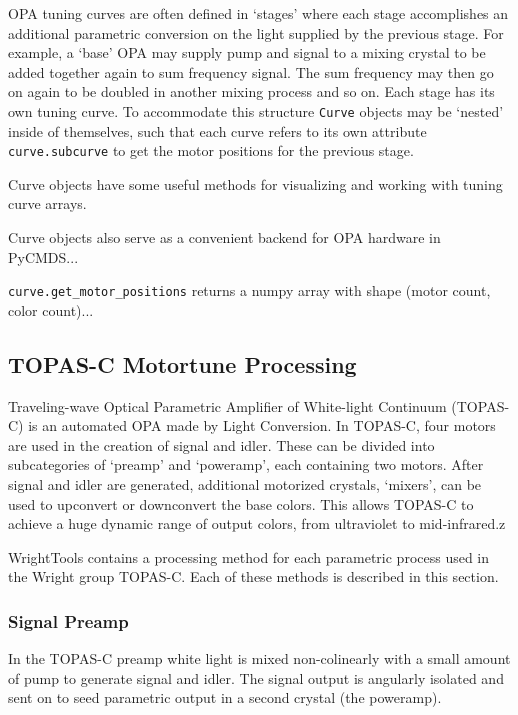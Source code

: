 OPA tuning curves are often defined in `stages' where each stage accomplishes an additional parametric conversion on the light supplied by the previous stage. For example, a `base' OPA may supply pump and signal to a mixing crystal to be added together again to sum frequency signal. The sum frequency may then go on again to be doubled in another mixing process and so on. Each stage has its own tuning curve. To accommodate this structure \texttt{Curve} objects may be `nested' inside of themselves, such that each curve refers to its own attribute \texttt{curve.subcurve} to get the motor positions for the previous stage.

Curve objects have some useful methods for visualizing and working with tuning curve arrays. 


Curve objects also serve as a convenient backend for OPA hardware in PyCMDS...

\texttt{curve.get\_motor\_positions} returns a numpy array with shape (motor count, color count)...


\subsection{TOPAS-C Motortune Processing}

Traveling-wave Optical Parametric Amplifier of White-light Continuum (TOPAS-C) is an automated OPA made by Light Conversion. In TOPAS-C, four motors are used in the creation of signal and idler. These can be divided into subcategories of `preamp' and `poweramp', each containing two motors. After signal and idler are generated, additional motorized crystals, `mixers', can be used to upconvert or downconvert the base colors. This allows TOPAS-C to achieve a huge dynamic range of output colors, from ultraviolet to mid-infrared.z

WrightTools contains a processing method for each parametric process used in the Wright group TOPAS-C. Each of these methods is described in this section.

\subsubsection{Signal Preamp}

In the TOPAS-C preamp white light is mixed non-colinearly with a small amount of pump to generate signal and idler. The signal output is angularly isolated and sent on to seed parametric output in a second crystal (the poweramp). 

